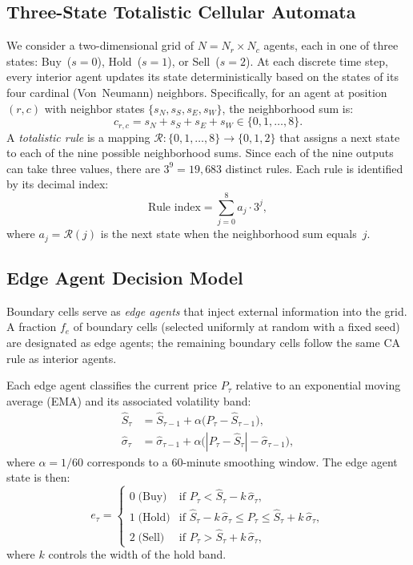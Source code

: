 
\subsection{Three-State Totalistic Cellular Automata}
\label{sec:ca-rules}
We consider a two-dimensional grid of $N = N_r \times N_c$ agents, each in one of three
states: Buy~($s=0$), Hold~($s=1$), or Sell~($s=2$). At each discrete time step, every
interior agent updates its state deterministically based on the states of its four
cardinal (Von~Neumann) neighbors. Specifically, for an agent at position $(r,c)$ with
neighbor states $\{s_N, s_S, s_E, s_W\}$, the neighborhood sum is:
\begin{equation}
  c_{r,c} = s_N + s_S + s_E + s_W \in \{0, 1, \ldots, 8\}.
  \label{eq:neighborhood-sum}
\end{equation}
A \emph{totalistic rule} is a mapping $\mathcal{R}: \{0,1,\ldots,8\} \to \{0,1,2\}$ that
assigns a next state to each of the nine possible neighborhood sums. Since each of the
nine outputs can take three values, there are $3^9 = 19{,}683$ distinct rules. Each rule
is identified by its decimal index:
\begin{equation}
  \text{Rule index} = \sum_{j=0}^{8} a_j \cdot 3^j,
  \label{eq:rule-index}
\end{equation}
where $a_j = \mathcal{R}(j)$ is the next state when the neighborhood sum equals~$j$.

\subsection{Edge Agent Decision Model}
\label{sec:edge-agents}
Boundary cells serve as \emph{edge agents} that inject external information into the
grid. A fraction $f_e$ of boundary cells (selected uniformly at random with a fixed seed)
are designated as edge agents; the remaining boundary cells follow the same CA rule as
interior agents.

Each edge agent classifies the current price $P_\tau$ relative to an exponential moving
average (EMA) and its associated volatility band:
\begin{align}
  \hat{S}_\tau &= \hat{S}_{\tau-1} + \alpha\bigl(P_\tau - \hat{S}_{\tau-1}\bigr), \label{eq:ema} \\
  \hat{\sigma}_\tau &= \hat{\sigma}_{\tau-1} + \alpha\bigl(|P_\tau - \hat{S}_\tau| - \hat{\sigma}_{\tau-1}\bigr), \label{eq:ema-vol}
\end{align}
where $\alpha = 1/60$ corresponds to a 60-minute smoothing window. The edge agent state
is then:
\begin{equation}
  e_\tau = \begin{cases}
    0 \;\text{(Buy)}  & \text{if } P_\tau < \hat{S}_\tau - k\,\hat{\sigma}_\tau, \\
    1 \;\text{(Hold)} & \text{if } \hat{S}_\tau - k\,\hat{\sigma}_\tau \le P_\tau \le \hat{S}_\tau + k\,\hat{\sigma}_\tau, \\
    2 \;\text{(Sell)} & \text{if } P_\tau > \hat{S}_\tau + k\,\hat{\sigma}_\tau,
  \end{cases}
  \label{eq:edge-state}
\end{equation}
where $k$ controls the width of the hold band.

